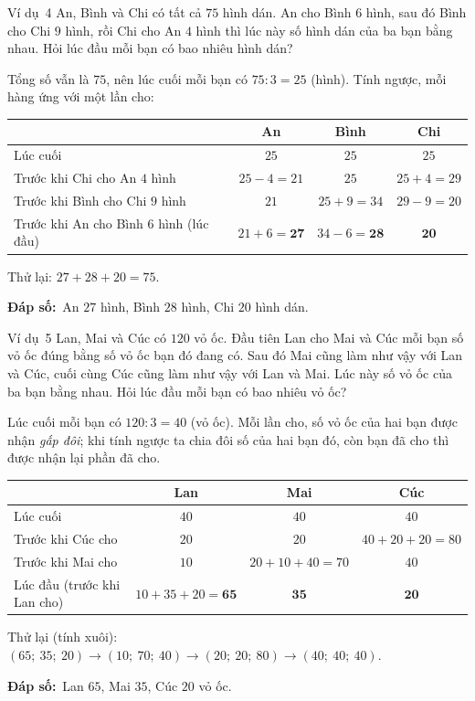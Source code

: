 \documentclass[11pt]{article}
\renewcommand{\arraystretch}{1.35}
\providecommand{\AnsWord}{Đáp số}
\newcommand{\dapso}[1]{\par\textbf{\AnsWord:}\ #1}
\newcommand{\guide}{\par\vspace{4pt}{\bfseries\color{tmBlue}\GuideWord}\par\vspace{3pt}\nopagebreak}
\newcommand{\gap}{\vspace{0.3cm}}
\def\GuideWord{Hướng dẫn giải.}
\def\AnsWord{Đáp số}
\def\ExWord{Ví dụ}
\begin{document}
\begin{exbox}{\ExWord\ 4}
An, Bình và Chi có tất cả $75$ hình dán. An cho Bình $6$ hình, sau đó Bình cho Chi $9$ hình, rồi Chi cho An $4$ hình thì lúc này số hình dán của ba bạn bằng nhau. Hỏi lúc đầu mỗi bạn có bao nhiêu hình dán?
\guide
Tổng số vẫn là $75$, nên lúc cuối mỗi bạn có $75:3=25$ (hình). Tính ngược, mỗi hàng ứng với một lần cho:
\begin{center}
\renewcommand{\arraystretch}{1.25}
\begin{tabular}{|l|c|c|c|}
\hline
 & An & Bình & Chi\\\hline
Lúc cuối & $25$ & $25$ & $25$\\\hline
Trước khi Chi cho An $4$ hình & $25-4=21$ & $25$ & $25+4=29$\\\hline
Trước khi Bình cho Chi $9$ hình & $21$ & $25+9=34$ & $29-9=20$\\\hline
Trước khi An cho Bình $6$ hình (lúc đầu) & $21+6=\mathbf{27}$ & $34-6=\mathbf{28}$ & $\mathbf{20}$\\\hline
\end{tabular}
\end{center}
Thử lại: $27+28+20=75$.
\dapso{An $27$ hình, Bình $28$ hình, Chi $20$ hình dán.}
\end{exbox}
\gap
\begin{exbox}{\ExWord\ 5}
Lan, Mai và Cúc có $120$ vỏ ốc. Đầu tiên Lan cho Mai và Cúc mỗi bạn số vỏ ốc đúng bằng số vỏ ốc bạn đó đang có. Sau đó Mai cũng làm như vậy với Lan và Cúc, cuối cùng Cúc cũng làm như vậy với Lan và Mai. Lúc này số vỏ ốc của ba bạn bằng nhau. Hỏi lúc đầu mỗi bạn có bao nhiêu vỏ ốc?
\guide
Lúc cuối mỗi bạn có $120:3=40$ (vỏ ốc). Mỗi lần cho, số vỏ ốc của hai bạn được nhận \emph{gấp đôi}; khi tính ngược ta chia đôi số của hai bạn đó, còn bạn đã cho thì được nhận lại phần đã cho.
\begin{center}
\renewcommand{\arraystretch}{1.25}
\begin{tabular}{|l|c|c|c|}
\hline
 & Lan & Mai & Cúc\\\hline
Lúc cuối & $40$ & $40$ & $40$\\\hline
Trước khi Cúc cho & $20$ & $20$ & $40+20+20=80$\\\hline
Trước khi Mai cho & $10$ & $20+10+40=70$ & $40$\\\hline
Lúc đầu (trước khi Lan cho) & $10+35+20=\mathbf{65}$ & $\mathbf{35}$ & $\mathbf{20}$\\\hline
\end{tabular}
\end{center}
Thử lại (tính xuôi): $(65;\ 35;\ 20)\to(10;\ 70;\ 40)\to(20;\ 20;\ 80)\to(40;\ 40;\ 40)$.
\dapso{Lan $65$, Mai $35$, Cúc $20$ vỏ ốc.}
\end{exbox}
\end{document}
